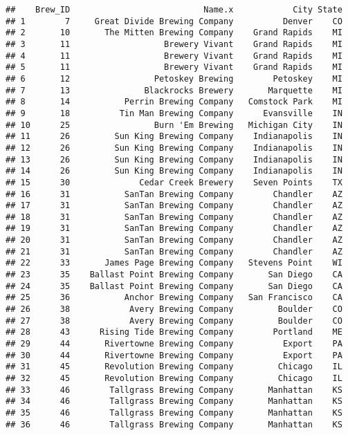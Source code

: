 \documentclass[
]{article}
\begin{document}
\begin{verbatim}
##    Brew_ID                           Name.x            City State
## 1        7     Great Divide Brewing Company          Denver    CO
## 2       10       The Mitten Brewing Company    Grand Rapids    MI
## 3       11                   Brewery Vivant    Grand Rapids    MI
## 4       11                   Brewery Vivant    Grand Rapids    MI
## 5       11                   Brewery Vivant    Grand Rapids    MI
## 6       12                 Petoskey Brewing        Petoskey    MI
## 7       13               Blackrocks Brewery       Marquette    MI
## 8       14           Perrin Brewing Company   Comstock Park    MI
## 9       18          Tin Man Brewing Company      Evansville    IN
## 10      25                 Burn 'Em Brewing   Michigan City    IN
## 11      26         Sun King Brewing Company    Indianapolis    IN
## 12      26         Sun King Brewing Company    Indianapolis    IN
## 13      26         Sun King Brewing Company    Indianapolis    IN
## 14      26         Sun King Brewing Company    Indianapolis    IN
## 15      30              Cedar Creek Brewery    Seven Points    TX
## 16      31           SanTan Brewing Company        Chandler    AZ
## 17      31           SanTan Brewing Company        Chandler    AZ
## 18      31           SanTan Brewing Company        Chandler    AZ
## 19      31           SanTan Brewing Company        Chandler    AZ
## 20      31           SanTan Brewing Company        Chandler    AZ
## 21      31           SanTan Brewing Company        Chandler    AZ
## 22      33       James Page Brewing Company   Stevens Point    WI
## 23      35    Ballast Point Brewing Company       San Diego    CA
## 24      35    Ballast Point Brewing Company       San Diego    CA
## 25      36           Anchor Brewing Company   San Francisco    CA
## 26      38            Avery Brewing Company         Boulder    CO
## 27      38            Avery Brewing Company         Boulder    CO
## 28      43      Rising Tide Brewing Company        Portland    ME
## 29      44       Rivertowne Brewing Company          Export    PA
## 30      44       Rivertowne Brewing Company          Export    PA
## 31      45       Revolution Brewing Company         Chicago    IL
## 32      45       Revolution Brewing Company         Chicago    IL
## 33      46        Tallgrass Brewing Company       Manhattan    KS
## 34      46        Tallgrass Brewing Company       Manhattan    KS
## 35      46        Tallgrass Brewing Company       Manhattan    KS
## 36      46        Tallgrass Brewing Company       Manhattan    KS

\end{verbatim}
\end{document}
